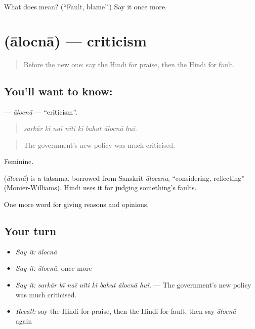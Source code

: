 \begin{tcolorbox}[breakable,colback=teal!4,colframe=teal!35!black,title={Before you move on}]
What does  mean? (\textquotedblleft{}Fault, blame\textquotedblright{}.) Say it once more.
\end{tcolorbox}
\section[\texorpdfstring{\hi{आलोचना} (ālocnā)}{आलोचना (ālocnā)}]{ (ālocnā) — criticism}

\label{lesson:HI-C367-alocna}



\begin{quote}
Before the new one: say the Hindi for praise, then the Hindi for fault.
\end{quote}

\subsection*{You'll want to know: }
\textbf{} — \emph{ālocnā} — \textquotedblleft{}criticism\textquotedblright{}.

\begin{quote}
       
\end{quote}

\begin{quote}
\emph{sarkār kī naī nīti kī bahut ālocnā huī.}
\end{quote}

\begin{quote}
The government's new policy was much criticised.
\end{quote}

Feminine.

\begin{cousinweb}
\textbf{} (\emph{ālocnā}) is a tatsama, borrowed from Sanskrit \emph{ālocana}, \textquotedblleft{}considering, reflecting\textquotedblright{} (Monier-Williams). Hindi uses it for judging something's faults.
\end{cousinweb}

\begin{grammarlens}[title={What you've built}]
One more word for giving reasons and opinions.
\end{grammarlens}

\subsection*{Your turn}
\begin{itemize}
\raggedright
  \item \emph{Say it:} \emph{ālocnā}
  \item \emph{Say it:} \emph{ālocnā}, once more
  \item \emph{Say it:} \emph{sarkār kī naī nīti kī bahut ālocnā huī.} — The government's new policy was much criticised.
  \item \emph{Recall:} say the Hindi for praise, then the Hindi for fault, then say \emph{ālocnā} again
\end{itemize}

